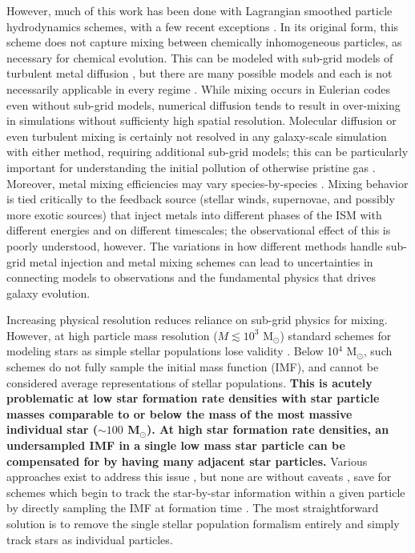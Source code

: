 \documentclass[fleqn,usenatbib,useAMS]{mnras}
\begin{document}
However, much of this work has been done with Lagrangian smoothed particle hydrodynamics schemes, with a few recent exceptions  \citep{Few2012,Simpson2013,Few2014,Vorobyov2015,Corlies2018}. In its original form, this scheme does not capture mixing between chemically inhomogeneous particles, as necessary for chemical evolution. This can be modeled with sub-grid models of turbulent metal diffusion \citep[e.g.][]{Shen2010,Shen2013,Brook2014,Su2017a,Escala2018}, but there are many possible models and each is not necessarily applicable in every regime \citep[see ][]{Revaz2016}. While mixing occurs in Eulerian codes even without sub-grid models, numerical diffusion tends to result in over-mixing in simulations without sufficienty high spatial resolution. Molecular diffusion or even turbulent mixing is certainly not resolved in any galaxy-scale simulation with either method, requiring additional sub-grid models; this can be particularly important for understanding the initial pollution of otherwise pristine gas \citep[see ][ and references therein]{PanScannapiecoScalo2013,Sarmento2017}. Moreover, metal mixing efficiencies may vary species-by-species \citep[e.g.][]{Cohen2013, Roederer2014, FrebelNorris2015, Hirai2017, Cote2017b, KrumholzTing2018}. Mixing behavior is tied critically to the feedback source (stellar winds, supernovae, and possibly more exotic sources) that inject metals into different phases of 
the ISM with different energies and on different timescales; the observational effect of this is poorly understood, however. The variations in how different methods handle sub-grid metal injection and metal mixing schemes can lead to uncertainties in connecting models to observations and the fundamental physics that drives galaxy evolution.

Increasing physical resolution reduces reliance on sub-grid physics for mixing.  However, at high particle mass resolution ($M \lesssim 10^3$ M$_{\odot}$) standard schemes for modeling stars as simple stellar populations lose validity  \citep[as studied in detail by][]{Revaz2016}. Below 10$^4$ M$_{\odot}$, such schemes do not fully sample the initial mass function (IMF), and cannot be considered average representations of stellar populations. \textbf{This is acutely problematic at low star formation rate densities with star particle masses comparable to or below the mass of the most massive individual star ($\sim 100$ M$_{\odot}$). At high star formation rate densities, an undersampled IMF in a single low mass star particle can be compensated for by having many adjacent star particles.} Various approaches exist to address this issue \citep[e.g.][]{Kobayashi2000,WeidnerKroupa2004,Pflamm-AltenburgKroupa2006,RevazJablonka2012,Kroupa2013,Rosdahl2015,Su2017b}, but none are without caveats \citep{Revaz2016}, save for schemes which begin to track the star-by-star information within a given particle by directly sampling the IMF at formation time \citep[e.g.][]{Hu2017}. The most straightforward solution is to remove the single stellar population formalism entirely and simply track stars as individual particles. 
 
\end{document}
